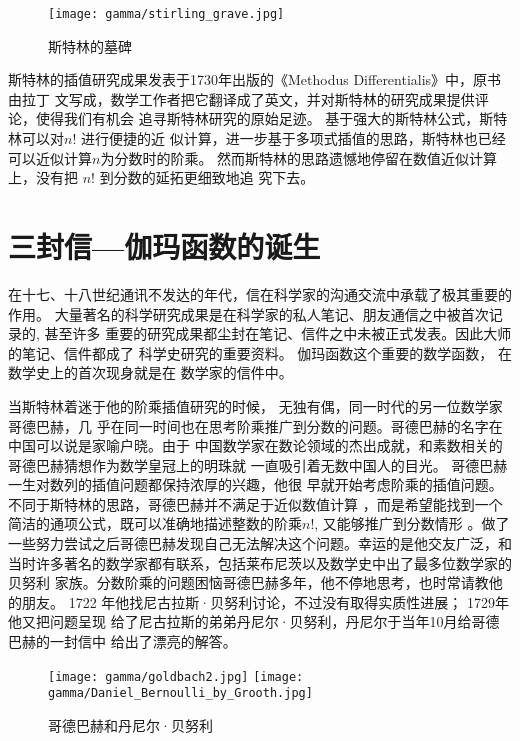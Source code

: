 {\begin{figure}[htbp]
\centering
\texttt{[image: gamma/stirling\_grave.jpg]}
\caption{斯特林的墓碑}
\end{figure}

斯特林的插值研究成果发表于1730年出版的《Methodus Differentialis》中，原书由拉丁
文写成，数学工作者把它翻译成了英文，并对斯特林的研究成果提供评论，使得我们有机会
追寻斯特林研究的原始足迹。 基于强大的斯特林公式，斯特林可以对$n!$ 进行便捷的近
似计算，进一步基于多项式插值的思路，斯特林也已经可以近似计算$n$为分数时的阶乘。
然而斯特林的思路遗憾地停留在数值近似计算上，没有把 $n!$ 到分数的延拓更细致地追
究下去。


\section{三封信---伽玛函数的诞生}

在十七、十八世纪通讯不发达的年代，信在科学家的沟通交流中承载了极其重要的作用。
大量著名的科学研究成果是在科学家的私人笔记、朋友通信之中被首次记录的, 甚至许多
重要的研究成果都尘封在笔记、信件之中未被正式发表。因此大师的笔记、信件都成了
科学史研究的重要资料。 伽玛函数这个重要的数学函数， 在数学史上的首次现身就是在
数学家的信件中。

当斯特林着迷于他的阶乘插值研究的时候， 无独有偶，同一时代的另一位数学家哥德巴赫，几
乎在同一时间也在思考阶乘推广到分数的问题。哥德巴赫的名字在中国可以说是家喻户晓。由于
中国数学家在数论领域的杰出成就，和素数相关的哥德巴赫猜想作为数学皇冠上的明珠就
一直吸引着无数中国人的目光。 哥德巴赫一生对数列的插值问题都保持浓厚的兴趣，他很
早就开始考虑阶乘的插值问题。不同于斯特林的思路，哥德巴赫并不满足于近似数值计算
，而是希望能找到一个简洁的通项公式，既可以准确地描述整数的阶乘$n!$, 又能够推广到分数情形
。做了一些努力尝试之后哥德巴赫发现自己无法解决这个问题。幸运的是他交友广泛，和
当时许多著名的数学家都有联系，包括莱布尼茨以及数学史中出了最多位数学家的贝努利
家族。分数阶乘的问题困恼哥德巴赫多年，他不停地思考，也时常请教他的朋友。
1722 年他找尼古拉斯·贝努利讨论，不过没有取得实质性进展； 1729年他又把问题呈现
给了尼古拉斯的弟弟丹尼尔·贝努利，丹尼尔于当年10月给哥德巴赫的一封信中
给出了漂亮的解答。

\begin{figure}[htbp]
\centering
\texttt{[image: gamma/goldbach2.jpg]}
\quad\quad
\texttt{[image: gamma/Daniel\_Bernoulli\_by\_Grooth.jpg]}
\caption{哥德巴赫和丹尼尔·贝努利}
\end{figure}


}
